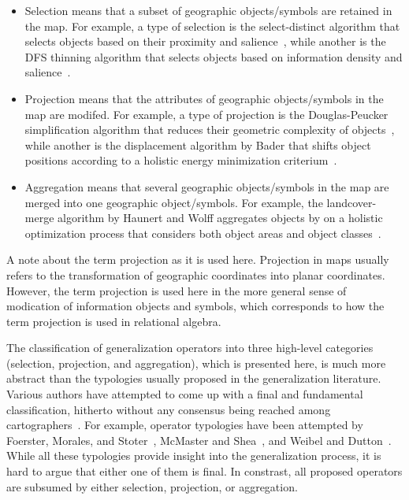 \documentclass[11pt, oneside]{report}
\begin{document}
{\begin{itemize}
\item Selection means that a subset of geographic objects/symbols are retained in the map. For example, a type of selection is the select-distinct algorithm that selects objects based on their proximity and salience~\cite{nutanong2012multiresolution}, while another is the DFS thinning algorithm that selects objects based on information density and salience~\cite{sarma2012fusiontables}.

\item Projection means that the attributes of geographic objects/symbols in the map are modifed. For example, a type of projection is the Douglas-Peucker simplification algorithm that reduces their geometric complexity of objects~\cite{douglas1973algorithms}, while another is the displacement algorithm by Bader that shifts object positions according to a holistic energy minimization criterium~\cite{bader2001energy}.

\item Aggregation means that several geographic objects/symbols in the map are merged into one geographic object/symbols. For example, the landcover-merge algorithm by Haunert and Wolff aggregates objects by on a holistic optimization process that considers both object areas and object classes~\cite{haunert2006landcover}.
\end{itemize}

A note about the term projection as it is used here. Projection in maps usually refers to the transformation of geographic coordinates into planar coordinates. However, the term projection is used here in the more general sense of modication of information objects and symbols, which corresponds to how the term projection is used in relational algebra.

The classification of generalization operators into three high-level categories (selection, projection, and aggregation), which is presented here, is much more abstract than the typologies usually proposed in the generalization literature. Various authors have attempted to come up with a final and fundamental classification, hitherto without any consensus being reached among cartographers~\cite{rieger1993consensus}. For example, operator typologies have been attempted by Foerster, Morales, and Stoter~\cite{foerster2008classification}, McMaster and Shea~\cite{mcmaster1992generalization}, and Weibel and Dutton~\cite{weibel1999generalising}. While all these typologies provide insight into the generalization process, it is hard to argue that either one of them is final. In constrast, all proposed operators are subsumed by either selection, projection, or aggregation.

}
\end{document}
